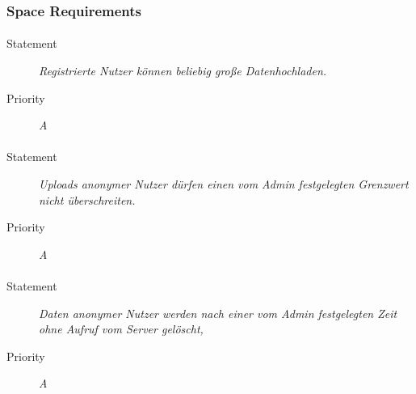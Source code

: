 \subsubsection{Space Requirements}

\paragraph{}
\begin{description}
\item[Statement] \textit{Registrierte Nutzer können beliebig große Datenhochladen.}
\item[Priority] \textit{A}
\end{description}

\paragraph{}
\begin{description}
\item[Statement] \textit{Uploads anonymer Nutzer dürfen einen vom Admin festgelegten Grenzwert nicht überschreiten.}
\item[Priority] \textit{A}
\end{description}

\paragraph{}
\begin{description}
\item[Statement] \textit{Daten anonymer Nutzer werden nach einer vom Admin festgelegten Zeit ohne Aufruf vom Server gelöscht,}
\item[Priority] \textit{A}
\end{description}